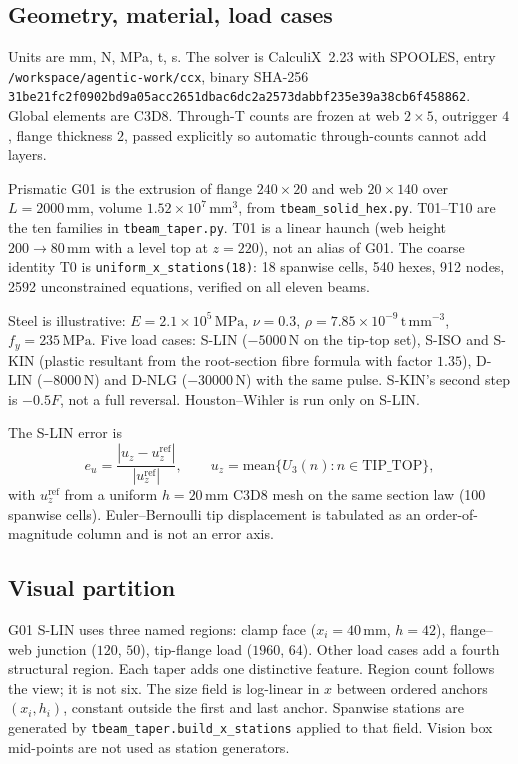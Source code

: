 \documentclass[applsci,article,submit,pdftex,oneauthor]{Definitions/mdpi}
\begin{document}
\subsection{Geometry, material, load cases}

Units are mm, N, MPa, t, s. The solver is CalculiX~2.23 with SPOOLES, entry \texttt{/workspace/agentic-work/ccx}, binary SHA-256 \texttt{31be21fc2f0902bd9a05acc2651dbac6dc2a2573dabbf235e39a38cb6f458862}. Global elements are C3D8. Through-T counts are frozen at web $2\times 5$, outrigger $4$, flange thickness $2$, passed explicitly so automatic through-counts cannot add layers.

Prismatic G01 is the extrusion of flange $240\times 20$ and web $20\times 140$ over $L=2000\,\mathrm{mm}$, volume $1.52\times 10^7\,\mathrm{mm}^3$, from \texttt{tbeam\_solid\_hex.py}. T01--T10 are the ten families in \texttt{tbeam\_taper.py}. T01 is a linear haunch (web height $200\to 80\,\mathrm{mm}$ with a level top at $z=220$), not an alias of G01. The coarse identity T0 is \texttt{uniform\_x\_stations(18)}: 18 spanwise cells, 540 hexes, 912 nodes, 2592 unconstrained equations, verified on all eleven beams.

Steel is illustrative: $E=2.1\times 10^5\,\mathrm{MPa}$, $\nu=0.3$, $\rho=7.85\times 10^{-9}\,\mathrm{t\,mm}^{-3}$, $f_y=235\,\mathrm{MPa}$. Five load cases: S-LIN ($-5000\,\mathrm{N}$ on the tip-top set), S-ISO and S-KIN (plastic resultant from the root-section fibre formula with factor $1.35$), D-LIN ($-8000\,\mathrm{N}$) and D-NLG ($-30000\,\mathrm{N}$) with the same pulse. S-KIN's second step is $-0.5F$, not a full reversal. Houston--Wihler is run only on S-LIN.

The S-LIN error is
\begin{equation}
e_u=\frac{|u_z-u_z^{\mathrm{ref}}|}{|u_z^{\mathrm{ref}}|},\qquad
u_z=\mathrm{mean}\{U_3(n):n\in\mathrm{TIP\_TOP}\},
\end{equation}
with $u_z^{\mathrm{ref}}$ from a uniform $h=20\,\mathrm{mm}$ C3D8 mesh on the same section law (100 spanwise cells). Euler--Bernoulli tip displacement is tabulated as an order-of-magnitude column and is not an error axis.

\subsection{Visual partition}

G01 S-LIN uses three named regions: clamp face ($x_i=40\,\mathrm{mm}$, $h=42$), flange--web junction ($120$, $50$), tip-flange load ($1960$, $64$). Other load cases add a fourth structural region. Each taper adds one distinctive feature. Region count follows the view; it is not six. The size field is log-linear in $x$ between ordered anchors $(x_i,h_i)$, constant outside the first and last anchor. Spanwise stations are generated by \texttt{tbeam\_taper.build\_x\_stations} applied to that field. Vision box mid-points are not used as station generators.
\end{document}
